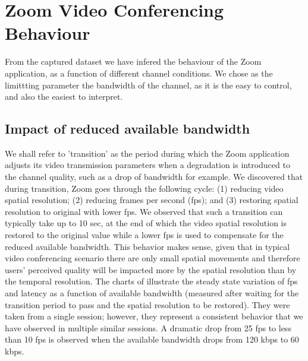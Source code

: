 \section{Zoom Video Conferencing Behaviour}
From the captured dataset we have infered the behaviour of the Zoom application, as a function of different channel conditions. We chose as the limittting parameter the bandwidth of the channel, as it is the easy to control, and also the easiest to interpret.

\subsection{Impact of reduced available bandwidth}
We shall refer to 'transition' as the period during which the Zoom application adjusts its video transmission parameters when a degradation is introduced to the channel quality, such as a drop of bandwidth for example. We discovered that during transition, Zoom goes through the following cycle: (1) reducing video spatial resolution; (2) reducing frames per second (fps); and (3) restoring spatial resolution to original with lower fps. We observed that such a transition can typically take up to 10 sec, at the end of which the video spatial resolution is restored to the original value while a lower fps is used to compensate for the reduced available bandwidth. This behavior makes sense, given that in typical video conferencing scenario there are only small spatial movements and therefore users' perceived quality will be impacted more by the spatial resolution than by the temporal resolution. The charts of  illustrate the steady state variation of fps and latency as a function of available bandwidth (measured after waiting for the transition period to pass and the spatial resolution to be restored). They were taken from a single session; however, they represent a consistent behavior that we have observed in multiple similar sessions. A dramatic drop from 25 fps to less than 10 fps is observed when the available bandwidth drops from 120 kbps to 60 kbps. 
